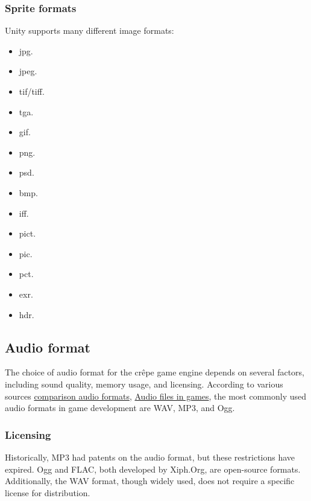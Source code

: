 \documentclass{projdoc}
\begin{document}
\subsubsection{Sprite formats}

Unity supports many different image formats:\noparbreak
\begin{multicols}{5}
\begin{itemize}
	\item jpg.
	\item jpeg.
	\item tif/tiff.
	\item tga.
	\item gif.
	\item png.
	\item psd.
	\item bmp.
	\item iff.
	\item pict.
	\item pic.
	\item pct.
	\item exr.
	\item hdr.
\end{itemize}
\end{multicols}

\subsection{Audio format}

The choice of audio format for the cr\^epe game engine depends on several factors,
including sound quality, memory usage, and licensing. According to various sources
\href{https://dev.to/tenry/comparison-of-audio-formats-for-games-jak}{comparison audio formats},
\href{https://www.universityofgames.net/articles/audio-file-formats-used-in-game-development/}{Audio files in games},
the most commonly used audio formats in game development are WAV, MP3, and Ogg.

\subsubsection{Licensing}

Historically, MP3 had patents on the audio format, but these restrictions have
expired. Ogg and FLAC, both developed by Xiph.Org, are open-source formats.
Additionally, the WAV format, though widely used, does not require a specific license
for distribution.
\end{document}
